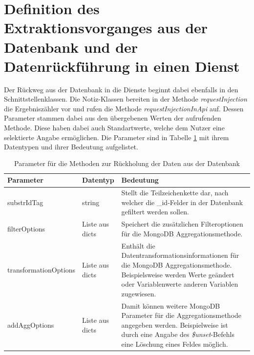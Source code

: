\section{Definition des Extraktionsvorganges aus der Datenbank und der Datenrückführung in einen Dienst}

Der Rückweg aus der Datenbank in die Dienste beginnt dabei ebenfalls in den Schnittstellenklassen. Die Notiz-Klassen bereiten in der Methode \textit{requestInjection} die Ergebniszähler vor und rufen die Methode \textit{requestInjectionInApi} auf. Dessen Parameter stammen dabei aus den übergebenen Werten der aufrufenden Methode. Diese haben dabei auch Standartwerte, welche dem Nutzer eine selektierte Angabe ermöglichen. Die Parameter sind in Tabelle \ref{tab:params} mit ihrem Datentypen und ihrer Bedeutung aufgelistet.

\begin {table}[H]
\caption{Parameter für die Methoden zur Rückholung der Daten aus der Datenbank}
\begin{tabular}{|l|l|p{7.5cm}|}
	\hline
	\textbf{Parameter} & \textbf{Datentyp} & \textbf{Bedeutung}\\
	\hline
	substrIdTag & string & Stellt die Teilzeichenkette dar, nach welcher die \_id-Felder in der Datenbank gefiltert werden sollen. \\
	\hline
	filterOptions & Liste aus dicts & Speichert die zusätzlichen Filteroptionen für die MongoDB Aggregationsmethode.\\
	\hline
	transformationOptions & Liste aus dicts & Enthält die Datentransformationsinformationen für die MongoDB Aggregationsmethode. Beispielsweise werden Werte geändert oder Variablenwerte anderen Variablen zugewiesen.\\
	\hline
	addAggOptions & Liste aus dicts & Damit können weitere MongoDB Parameter für die Aggregationsmethode angegeben werden. Beispielweise ist durch eine Angabe des \textit{\$unset}-Befehls eine Löschung eines Feldes möglich.\\
	\hline
\end{tabular}
\label{tab:params}
\end{table}

